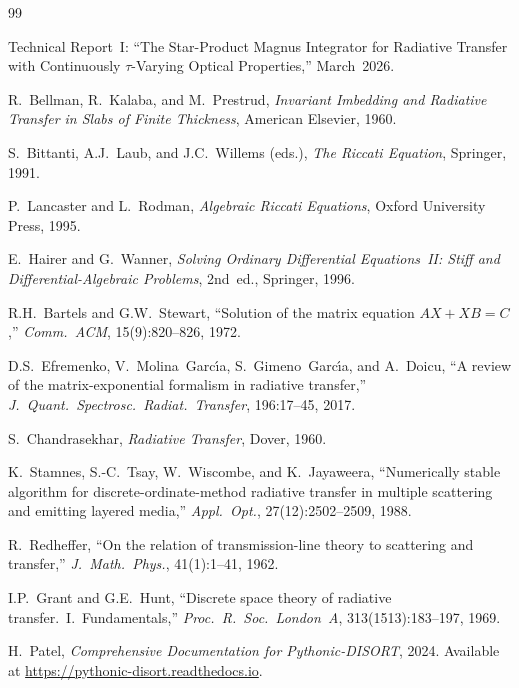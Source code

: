 \documentclass[11pt,a4paper]{article}
\theoremstyle{definition}
\begin{document}
\begin{thebibliography}{99}

Technical Report~I: ``The Star-Product Magnus Integrator for Radiative
Transfer with Continuously $\tau$-Varying Optical Properties,''
March~2026.

R.~Bellman, R.~Kalaba, and M.~Prestrud, \emph{Invariant Imbedding and
Radiative Transfer in Slabs of Finite Thickness}, American Elsevier,
1960.

S.~Bittanti, A.J.~Laub, and J.C.~Willems (eds.), \emph{The Riccati
Equation}, Springer, 1991.

P.~Lancaster and L.~Rodman, \emph{Algebraic Riccati Equations},
Oxford University Press, 1995.

E.~Hairer and G.~Wanner, \emph{Solving Ordinary Differential
Equations~II: Stiff and Differential-Algebraic Problems}, 2nd~ed.,
Springer, 1996.

R.H.~Bartels and G.W.~Stewart, ``Solution of the matrix equation
$AX + XB = C$,'' \emph{Comm.\ ACM}, 15(9):820--826, 1972.

D.S.~Efremenko, V.~Molina~Garc\'\i a, S.~Gimeno~Garc\'\i a, and
A.~Doicu, ``A review of the matrix-exponential formalism in radiative
transfer,'' \emph{J.\ Quant.\ Spectrosc.\ Radiat.\ Transfer},
196:17--45, 2017.

S.~Chandrasekhar, \emph{Radiative Transfer}, Dover, 1960.

K.~Stamnes, S.-C.~Tsay, W.~Wiscombe, and K.~Jayaweera, ``Numerically
stable algorithm for discrete-ordinate-method radiative transfer in
multiple scattering and emitting layered media,'' \emph{Appl.\ Opt.},
27(12):2502--2509, 1988.

R.~Redheffer, ``On the relation of transmission-line theory to
scattering and transfer,'' \emph{J.\ Math.\ Phys.}, 41(1):1--41, 1962.

I.P.~Grant and G.E.~Hunt, ``Discrete space theory of radiative
transfer.~I.~Fundamentals,'' \emph{Proc.\ R.\ Soc.\ London~A},
313(1513):183--197, 1969.

H.~Patel, \emph{Comprehensive Documentation for Pythonic-DISORT},
2024.  Available at
\url{https://pythonic-disort.readthedocs.io}.

\end{thebibliography}
\end{document}
